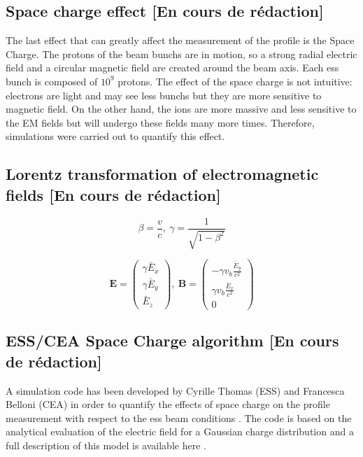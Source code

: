 \begin{refsection}
  \section{Space charge effect [En cours de rédaction]}
  The last effect that can greatly affect the measurement of the profile is the Space Charge. The protons of the beam bunchs are in motion, so a strong radial electric field and a circular magnetic field are created around the beam axis. Each \acrshort{ess} bunch is composed of $10^{9}$ protons. The effect of the space charge is not intuitive: electrons are light and may see less bunchs but they are more sensitive to magnetic field. On the other hand, the ions are more massive and less sensitive to the EM fields but will undergo these fields many more times. Therefore, simulations were carried out to quantify this effect.

  \subsection{Lorentz transformation of electromagnetic fields [En cours de rédaction]}

  \begin{equation}
    \beta = \frac{v}{c}
    ,\
    \gamma = \frac{1}{\sqrt{1 - \beta^{2}}}
  \end{equation}

  \begin{equation}
    \boldsymbol{E} =
    \begin{pmatrix}
      \gamma \bar{E}_{x} \\
      \gamma \bar{E}_{y} \\
      \bar{E}_{z}
    \end{pmatrix}
    ,\
    \boldsymbol{B} =
    \begin{pmatrix}
      -\gamma v_{b} \frac{\bar{E}_y}{c^{2}} \\
      \gamma v_{b} \frac{\bar{E}_x}{c^{2}}  \\
      0
    \end{pmatrix}
  \end{equation}
  \subsection{ESS/CEA Space Charge algorithm [En cours de rédaction]}
  A simulation code has been developed by Cyrille Thomas (ESS) and Francesca Belloni (CEA) in order to quantify the effects of space charge on the profile measurement with respect to the \acrshort{ess} beam conditions \cite{Thomas-2016-1,Belloni2018}. The code is based on the analytical evaluation of the electric field for a Gaussian charge distribution and a full description of this model is available here \cite{Wanzenberg2010}.

\end{refsection}
